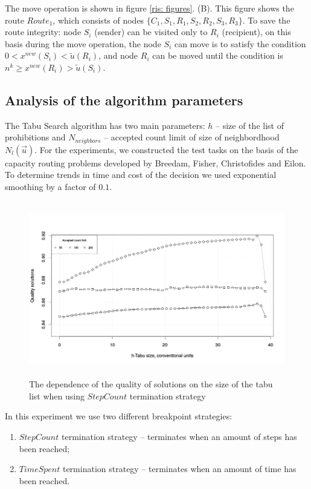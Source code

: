 \documentclass[]{TAACpaper}
\begin{document}
The move operation is shown in figure \ref{ris: figures}. (B). This figure shows the route $ Route_1 $, which consists of nodes $ \{C_1, S_1, R_1, S_2, R_2, S_3, R_3 \} $. To save the route integrity: node $S_i $ (sender) can be visited only to $ R_i $ (recipient), on this basis during the move operation, the node $ S_i $ can move is to satisfy the condition $ 0 < x^{new} ( S_i) < \widetilde{u} (R_i) $, and  node $R_i$ can be moved until the condition is $ n^k \geq x^{new} (R_i)> \widetilde{u} (S_i) $.


\subsection{Analysis of the algorithm parameters}
The Tabu Search algorithm has two main parameters: $h$ -- size of the list of prohibitions and $N_{neighbors}$ -- accepted count limit of size of neighbordhood $N_l(\vec{u})$. For the experiments, we constructed the test tasks on the basis of the capacity routing problems developed by Breedam, Fisher, Christofides and Eilon. To determine trends in time and cost of the decision we used exponential smoothing by a factor of $0.1$.

\begin{figure}[h]
	\hfil\includegraphics[height=3.0in]{images/tabuSize_stepCount}\hfil
	\caption
	{
	  The dependence of the quality of solutions on the size of the tabu list when using $ StepCount $ termination strategy
	}
	\label{aba:fig2}
\end{figure}

In this experiment we use two different breakpoint strategies: 
\begin{enumerate}
	\item $StepCount$ termination strategy --  terminates when an amount of steps has been reached;
	\item $TimeSpent$ termination strategy -- terminates when an amount of time has been reached.
\end{enumerate}
\end{document}
